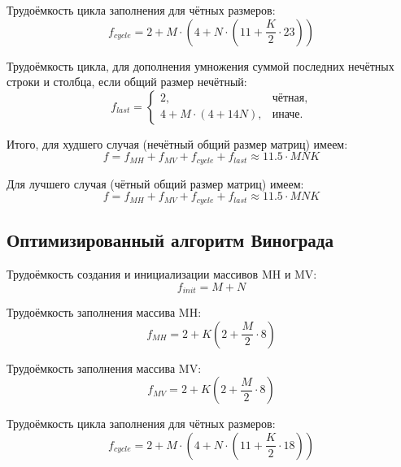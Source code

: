 Трудоёмкость цикла заполнения для чётных размеров:
\begin{equation}
	\label{for:cycle}
	f_{cycle} = 2 + M \cdot (4 + N \cdot (11 + \frac{K}{2} \cdot 23))
\end{equation}
	
Трудоёмкость цикла, для дополнения умножения суммой последних нечётных строки и столбца, если общий размер нечётный:
\begin{equation}
	\label{for:last}
	f_{last} = \begin{cases}
		2, & \text{чётная,}\\
		4 + M \cdot (4 + 14N), & \text{иначе.}
	\end{cases}
\end{equation}

Итого, для худшего случая (нечётный общий размер матриц) имеем:
\begin{equation}
	\label{for:bad}
	f =  f_{MH} + f_{MV} + f_{cycle} + f_{last}\approx 11.5 \cdot MNK
\end{equation}

Для лучшего случая (чётный общий размер матриц) имеем:
\begin{equation}
	\label{for:good}
f =  f_{MH} + f_{MV} + f_{cycle} + f_{last} \approx 11.5 \cdot MNK
\end{equation}


\subsection{Оптимизированный алгоритм Винограда}

Трудоёмкость создания и инициализации массивов MH и MV:
\begin{equation}
	\label{for:impr_init}
	f_{init} = M + N
\end{equation}
	
Трудоёмкость заполнения массива MH:
\begin{equation}
	\label{for:impr_MH}
	f_{MH} =  2 + K (2 + \frac{M}{2} \cdot 8)
\end{equation}
	
Трудоёмкость заполнения массива MV:
\begin{equation}
	\label{for:impr_MV}
	f_{MV} =  2 + K (2 + \frac{M}{2} \cdot 8)
\end{equation}
	
Трудоёмкость цикла заполнения для чётных размеров:
\begin{equation}
	\label{for:impr_cycle}
	f_{cycle} =2 + M \cdot (4 + N \cdot (11 + \frac{K}{2} \cdot 18))
\end{equation}
	

